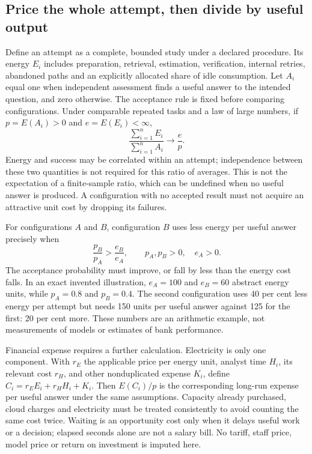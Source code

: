 \subsection{Price the whole attempt, then divide by useful output}

Define an attempt as a complete, bounded study under a declared procedure.
Its energy $E_i$ includes preparation, retrieval, estimation, verification,
internal retries, abandoned paths and an explicitly allocated share of
idle consumption. Let $A_i$ equal one when independent assessment finds a
useful answer to the intended question, and zero otherwise. The acceptance
rule is fixed before comparing configurations. Under comparable repeated
tasks and a law of large numbers, if $p=E(A_i)>0$ and $e=E(E_i)<\infty$,
\begin{equation}
 \frac{\sum_{i=1}^n E_i}{\sum_{i=1}^n A_i}
       \longrightarrow \frac{e}{p}.
 \label{closure:energy-useful}
\end{equation}
Energy and success may be correlated within an attempt; independence
between these two quantities is not required for this ratio of averages.
This is not the expectation of a finite-sample ratio, which can be undefined
when no useful answer is produced. A configuration with no accepted result
must not acquire an attractive unit cost by dropping its failures.

For configurations $A$ and $B$, configuration $B$ uses less energy per useful
answer precisely when
\begin{equation}
 \frac{p_B}{p_A}>\frac{e_B}{e_A},
 \qquad p_A,p_B>0,\quad e_A>0.
 \label{closure:energy-break-even}
\end{equation}
The acceptance probability must improve, or fall by less than the energy
cost falls. In an exact invented illustration, $e_A=100$ and $e_B=60$
abstract energy units, while $p_A=0.8$ and $p_B=0.4$. The second configuration
uses 40 per cent less energy per attempt but needs 150 units per useful
answer against 125 for the first: 20 per cent more. These numbers are an
arithmetic example, not measurements of models or estimates of bank
performance.

Financial expense requires a further calculation. Electricity is only one
component. With $r_E$ the applicable price per energy unit, analyst time
$H_i$, its relevant cost $r_H$, and other nonduplicated expense $K_i$, define
$C_i=r_E E_i+r_H H_i+K_i$. Then $E(C_i)/p$ is the corresponding long-run
expense per useful answer under the same assumptions. Capacity already
purchased, cloud charges and electricity must be treated consistently to
avoid counting the same cost twice. Waiting is an opportunity cost only
when it delays useful work or a decision; elapsed seconds alone are not a
salary bill. No tariff, staff price, model price or return on investment is
imputed here.

